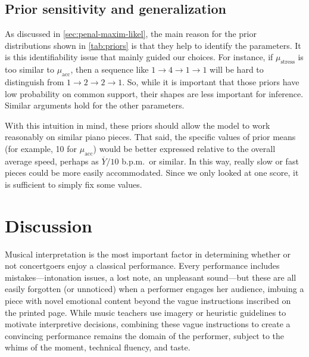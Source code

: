 \documentclass[aoas]{imsart}
\begin{document}

\subsection{Prior sensitivity and generalization}

As discussed in \autoref{sec:penal-maxim-likel}, the main reason for the prior distributions shown in
\autoref{tab:priors} is that they help to identify the
parameters. It is this identifiability issue that mainly guided our
choices. For instance, if $\mu_{\mbox{stress}}$ is too similar to
$\mu_{\mbox{acc}}$, then a sequence like $1\rightarrow 4 \rightarrow
1 \rightarrow 1$ will be hard to distinguish from $1\rightarrow 2
\rightarrow 2 \rightarrow 1$. So, while it is important that those
priors have low probability on common support, their shapes are less important for
inference. Similar arguments hold for the other parameters.

With this intuition in mind, these priors should allow the model to
work reasonably on similar piano pieces. That said, the specific
values of prior means (for example, 10 for $\mu_{\mbox{acc}}$)
would be better expressed relative to the overall average speed,
perhaps as $\overline{Y}/10$ b.p.m.\ or similar. In this way, really
slow or fast pieces could be more easily accommodated. Since we only looked at one
score, it is sufficient to simply fix some values. 

\section{Discussion}
\label{sec:discussion}


Musical interpretation is the most important factor 
in determining whether or not concertgoers enjoy a classical performance. Every
performance includes mistakes---intonation issues, a lost note, an
unpleasant sound---but these are all easily forgotten (or unnoticed) when a performer
engages her audience, imbuing a piece with novel emotional content
beyond the vague instructions inscribed on the printed page. While music teachers use
imagery or heuristic guidelines to motivate interpretive decisions, combining these
vague instructions to create a convincing performance remains the domain
of the performer, subject to the whims of the moment, technical
fluency, and taste.
\end{document}
